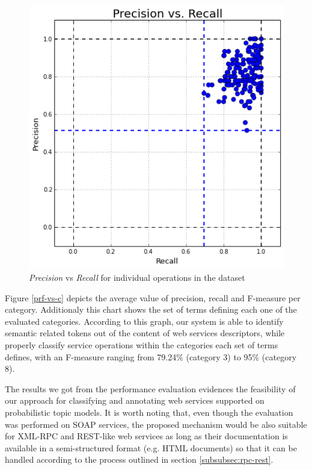 \begin{figure}[H]
\begin{center}
\includegraphics[scale=0.52]{images/PvsR}
\caption{\textit{Precision} vs \textit{Recall} for individual operations in the dataset}
\label{p-vs-r} 
\end{center}
\end{figure}

Figure \ref{prf-vs-c} depicts the average value of precision, recall and F-measure per category. Additionaly this chart shows the set of terms defining each one of the evaluated categories. According to this graph, our system is able to identify semantic related tokens out of the content of web services descriptors, while properly classify service operations within the categories each set of terms defines, with an F-measure ranging from 79.24\% (category 3) to 95\% (category 8).

The results we got from the performance evaluation evidences the feasibility of our approach for classifying and annotating web services supported on probabilistic topic models. It is worth noting that, even though the evaluation was performed on SOAP services, the proposed mechanism would be also suitable for XML-RPC and REST-like web services as long as their documentation is available in a semi-structured format (e.g. HTML documents) so that it can be handled according to the process outlined in section \ref{subsubsec:rpc-rest}.

